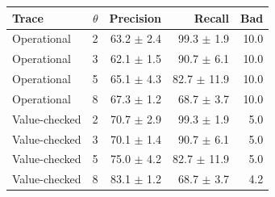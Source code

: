 \begin{tabular}{@{}lrrrr@{}}\toprule Trace & $\theta$ & Precision & Recall & Bad\\\midrule
Operational & 2 & 63.2 $\pm$ 2.4 & 99.3 $\pm$ 1.9 & 10.0 \\
Operational & 3 & 62.1 $\pm$ 1.5 & 90.7 $\pm$ 6.1 & 10.0 \\
Operational & 5 & 65.1 $\pm$ 4.3 & 82.7 $\pm$ 11.9 & 10.0 \\
Operational & 8 & 67.3 $\pm$ 1.2 & 68.7 $\pm$ 3.7 & 10.0 \\
Value-checked & 2 & 70.7 $\pm$ 2.9 & 99.3 $\pm$ 1.9 & 5.0 \\
Value-checked & 3 & 70.1 $\pm$ 1.4 & 90.7 $\pm$ 6.1 & 5.0 \\
Value-checked & 5 & 75.0 $\pm$ 4.2 & 82.7 $\pm$ 11.9 & 5.0 \\
Value-checked & 8 & 83.1 $\pm$ 1.2 & 68.7 $\pm$ 3.7 & 4.2 \\
\bottomrule\end{tabular}
